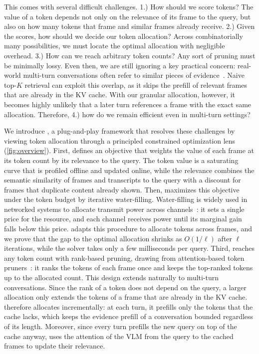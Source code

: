 This comes with several difficult challenges. 1.) How should we score tokens? The value of a token depends not only on the relevance of its frame to the query, but also on how many tokens that frame and similar frames already receive. 2.) Given the scores, how should we decide our token allocation? Across combinatorially many possibilities, we must locate the optimal allocation with negligible overhead. 3.) How can we reach arbitrary token counts? Any sort of pruning must be minimally lossy. Even then, we are still ignoring a key practical concern: real-world multi-turn conversations often refer to similar pieces of evidence~\cite{mtvideobench2025}. Naive top-$K$ retrieval can exploit this overlap, as it skips the prefill of relevant frames that are already in the KV cache. With our granular allocation, however, it becomes highly unlikely that a later turn references a frame with the exact same allocation. Therefore, 4.) how do we remain efficient even in multi-turn settings?

We introduce \name, a plug-and-play framework that resolves these challenges by viewing token allocation through a principled constrained optimization lens (\cref{fig:overview}). First, \name defines an objective that weights the value of each frame at its token count by its relevance to the query. The token value is a saturating curve that is profiled offline and updated online, while the relevance combines the semantic similarity of frames and transcripts to the query with a discount for frames that duplicate content already shown. Then, \name maximizes this objective under the token budget by iterative water-filling. Water-filling is widely used in networked systems to allocate transmit power across channels~\cite{boyd2004,yu2004iwf}: it sets a single price for the resource, and each channel receives power until its marginal gain falls below this price. \name adapts this procedure to allocate tokens across frames, and we prove that the gap to the optimal allocation shrinks as $O(1/\ell)$ after $\ell$ iterations, while the solver takes only a few milliseconds per query. Third, \name reaches any token count with rank-based pruning, drawing from attention-based token pruners~\cite{chen2024fastv,yang2024visionzip}: it ranks the tokens of each frame once and keeps the top-ranked tokens up to the allocated count. This design extends naturally to multi-turn conversations. Since the rank of a token does not depend on the query, a larger allocation only extends the tokens of a frame that are already in the KV cache. \name therefore allocates incrementally: at each turn, it prefills only the tokens that the cache lacks, which keeps the evidence prefill of a conversation bounded regardless of its length. Moreover, since every turn prefills the new query on top of the cache anyway, \name uses the attention of the VLM from the query to the cached frames to update their relevance.

